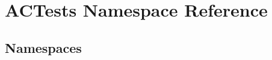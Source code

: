 \hypertarget{namespace_a_c_tests}{}\section{A\+C\+Tests Namespace Reference}
\label{namespace_a_c_tests}
\subsection*{Namespaces}
\begin{DoxyCompactItemize}
\end{DoxyCompactItemize}
